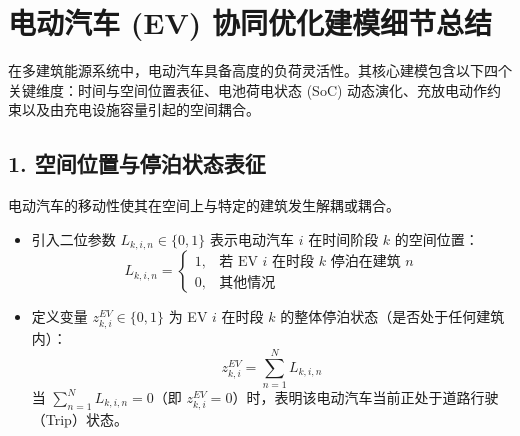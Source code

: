 \documentclass[11pt]{ctexart}
\begin{document}
\section*{电动汽车 (EV) 协同优化建模细节总结}

在多建筑能源系统中，电动汽车具备高度的负荷灵活性。其核心建模包含以下四个关键维度：时间与空间位置表征、电池荷电状态 (SoC) 动态演化、充放电动作约束以及由充电设施容量引起的空间耦合。

\subsection*{1. 空间位置与停泊状态表征}
电动汽车的移动性使其在空间上与特定的建筑发生解耦或耦合。
\begin{itemize}
    \item 引入二位参数 $L_{k,i,n} \in \{0,1\}$ 表示电动汽车 $i$ 在时间阶段 $k$ 的空间位置：
    \begin{equation}
        L_{k,i,n} =
        \begin{cases}
        1, & \text{若 EV } i \text{ 在时段 } k \text{ 停泊在建筑 } n \\
        0, & \text{其他情况}
        \end{cases}
    \end{equation}
    \item 定义变量 $z_{k,i}^{EV} \in \{0,1\}$ 为 EV $i$ 在时段 $k$ 的整体停泊状态（是否处于任何建筑内）：
    \begin{equation}
        z_{k,i}^{EV} = \sum_{n=1}^{N} L_{k,i,n}
    \end{equation}
    当 $\sum_{n=1}^{N} L_{k,i,n} = 0$（即 $z_{k,i}^{EV} = 0$）时，表明该电动汽车当前正处于道路行驶（Trip）状态。
\end{itemize}
\end{document}
